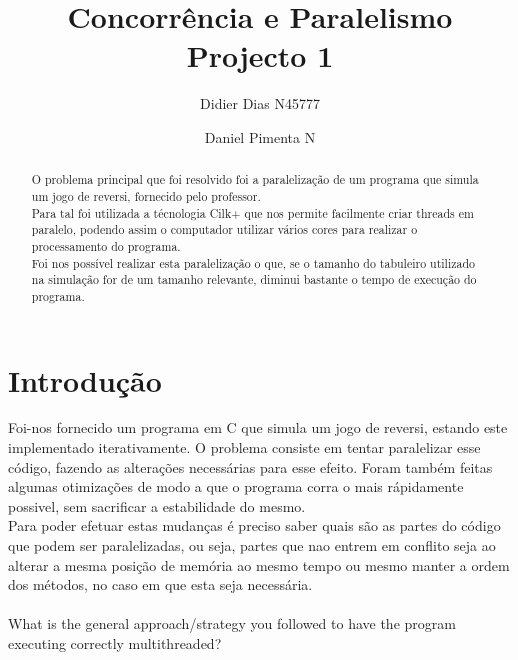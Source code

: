 \documentclass[a4paper]{article}
\title{Concorrência e Paralelismo \\
\large Projecto 1}
\author{Didier Dias N45777\and Daniel Pimenta N}
\begin{document}
\maketitle

\begin{abstract}
O problema principal que foi resolvido foi a paralelização de um programa que simula um jogo de reversi, fornecido pelo professor. \\
Para tal foi utilizada a técnologia Cilk+ que nos permite facilmente criar threads em paralelo, podendo assim o computador utilizar vários cores para realizar o processamento do programa.\\
Foi nos possível realizar esta paralelização o que, se o  tamanho do tabuleiro utilizado na simulação for de um tamanho relevante, diminui bastante o tempo de execução do programa.
\end{abstract}

\section{Introdução}

Foi-nos fornecido um programa em C que simula um jogo de reversi, estando este implementado iterativamente. O problema consiste em tentar paralelizar esse código, fazendo as alterações necessárias para esse efeito. Foram também feitas algumas otimizações de modo a que o programa corra o mais rápidamente possivel, sem sacrificar a estabilidade do mesmo.\\
Para poder efetuar estas mudanças é preciso saber quais são as partes do código que podem ser paralelizadas, ou seja, partes que nao entrem em conflito seja ao alterar a mesma posição de memória ao mesmo tempo ou mesmo manter a ordem dos métodos, no caso em que esta seja necessária.\\\\
What	is	the	general	
approach/strategy	you	 followed	 to	have	 the	program	executing	correctly	multithreaded?
\end{document}
